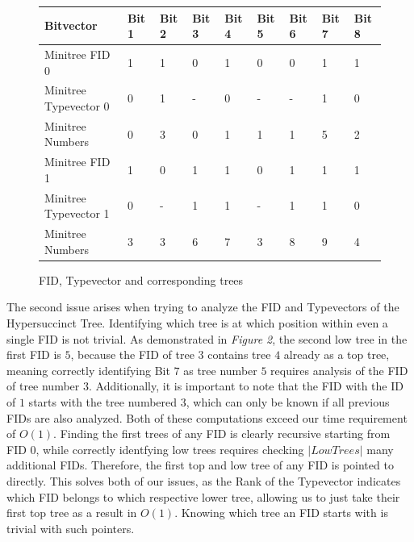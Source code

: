\documentclass{article}
\begin{document}
\begin{figure}[h]
	\begin{tabular}{ |p{3.5cm}||p{1cm}|p{1cm}|p{1cm}|p{1cm}|p{1cm}|p{1cm}|p{1cm}|p{1cm}|  }
		 \hline
		 Bitvector & Bit 1 &Bit 2&Bit 3&Bit 4& Bit 5 &Bit 6&Bit 7&Bit 8\\
		 \hline
		 Minitree FID 0 & 1 & 1& 0 & 1 & 0 & 0 & 1 & 1\\
		 Minitree Typevector 0& 0 & 1 & - & 0 & - & - & 1 & 0\\
		 Minitree Numbers & 0 & 3 &  0 & 1 & 1 & 1 & 5 & 2\\
		 \hline
		 Minitree FID 1 & 1 & 0& 1 & 1 & 0 & 1 & 1 & 1\\
		 Minitree Typevector 1& 0 & - & 1 & 1 & - & 1 & 1 & 0\\
		 Minitree Numbers & 3 & 3 &  6 & 7 & 3 & 8 & 9 & 4\\
		 \hline
	\end{tabular}
\caption{FID, Typevector and corresponding trees}
\label{fid:table2}
\end{figure}
The second issue arises when trying to analyze the FID and Typevectors of the Hypersuccinct Tree. Identifying which tree is at which position within even a single FID is not trivial. As demonstrated in \textit{Figure 2}, the second low tree in the first FID is $5$, because the FID of tree $3$ contains tree $4$ already as a top tree, meaning correctly identifying Bit $7$ as tree number $5$ requires analysis of the FID of tree number $3$. Additionally, it is important to note that the FID with the ID of $1$ starts with the tree numbered $3$, which can only be known if all previous FIDs are also analyzed. Both of these computations exceed our time requirement of $O(1)$. Finding the first trees of any FID is clearly recursive starting from FID $0$, while correctly identfying low trees requires checking $|Low Trees|$ many additional FIDs. Therefore, the first top and low tree of any FID is pointed to directly.
This solves both of our issues, as the Rank of the Typevector indicates which FID belongs to which respective lower tree, allowing us to just take their first top tree as a result in $O(1)$. Knowing which tree an FID starts with is trivial with such pointers.
\end{document}

